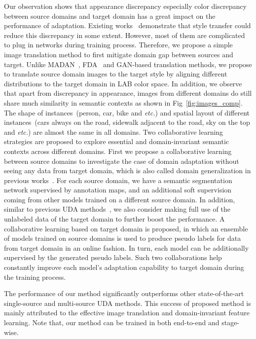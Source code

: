 \documentclass[final]{cvpr}
\def\etc{\textit{etc.}}
\begin{document}
Our observation shows that appearance discrepancy especially color discrepancy between source domains and target domain has a great impact on the performance of adaptation. Existing works~\cite{ulyanov2017improved,li2018closed,yoo2019photorealistic,huang2017arbitrary} demonstrate that style transfer could reduce this discrepancy in some extent. However, most of them are complicated to plug in networks during training process. Therefore, we propose a simple image translation method to first mitigate domain gap between sources and target. Unlike MADAN~\cite{zhao2019multi}, FDA~\cite{FDA_Yang_2020_CVPR} and GAN-based translation methods, we propose to translate source domain images to the target style by aligning different distributions to the target domain in LAB color space. In addition, we observe that apart from discrepancy in appearance, images from different domains do still share much similarity in semantic contexts as shown in Fig~\ref{fig:images_comp}. The shape of instances~(person, car, bike and \etc) and spatial layout of different instances~(cars always on the road, sidewalk adjacent to the road, sky on the top and \etc) are almost the same in all domains. Two collaborative learning strategies are proposed to explore essential and domain-invariant semantic contexts across different domains. 
First we propose a collaborative learning between source domains to investigate the case of domain adaptation without seeing any data from target domain,
which is also called domain generalization in previous works~\cite{dlow_gong2019dlow,pan2018two,zhang2020generalizable}. 
For each source domain, we have a semantic segmentation network supervised by annotation maps, and an additional soft supervision coming from other models trained on a different source domain. 
In addition, similar to previous UDA methods~\cite{zhao2019multi,FDA_Yang_2020_CVPR}, we also consider making full use of the unlabeled data of the target domain to further boost the performance. A collaborative learning based on target domain is proposed, in which an ensemble of models trained on source domains is used to produce pseudo labels for data from target domain in an online fashion. In turn, each model can be additionally supervised by the generated pseudo labels. Such two collaborations help constantly improve each model's adaptation capability to target domain during the training process.

The performance of our method significantly outperforms other state-of-the-art single-source and multi-source UDA methods. This success of proposed method is mainly attributed to the effective image translation and domain-invariant feature learning. Note that, our method can be trained in both end-to-end and stage-wise.
\end{document}
